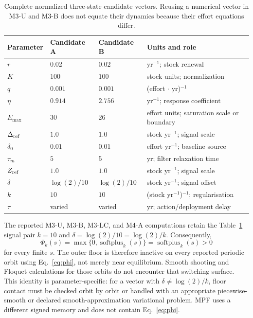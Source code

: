 \documentclass[11pt]{article}
\newcommand{\spx}{\operatorname{softplus}}
\begin{document}
\begin{table}[h]
\centering
\small
\caption{Complete normalized three-state candidate vectors. Reusing a numerical vector in M3-U and M3-B does not equate their dynamics because their effort equations differ.}
\label{tab:m3-parameters}
\begin{tabularx}{\textwidth}{p{1.7cm}XXp{3.2cm}}
\toprule
Parameter & Candidate A & Candidate B & Units and role\\
\midrule
$r$ & $0.02$ & $0.02$ & yr$^{-1}$; stock renewal\\
$K$ & $100$ & $100$ & stock units; normalization\\
$q$ & $0.001$ & $0.001$ & (effort $\cdot$ yr)$^{-1}$\\
$\eta$ & $0.914$ & $2.756$ & yr$^{-1}$; response coefficient\\
$E_{\max}$ & $30$ & $26$ & effort units; saturation scale or boundary\\
$\Delta_{\rm ref}$ & $1.0$ & $1.0$ & stock yr$^{-1}$; signal scale\\
$\delta_0$ & $0.01$ & $0.01$ & effort yr$^{-1}$; baseline source\\
$\tau_m$ & $5$ & $5$ & yr; filter relaxation time\\
$Z_{\rm ref}$ & $1.0$ & $1.0$ & stock yr$^{-1}$; signal scale\\
$\delta$ & $\log(2)/10$ & $\log(2)/10$ & stock yr$^{-1}$; signal offset\\
$k$ & $10$ & $10$ & (stock yr$^{-1}$)$^{-1}$; regularisation\\
$\tau$ & varied & varied & yr; action/deployment delay\\
\bottomrule
\end{tabularx}
\end{table}

The reported M3-U, M3-B, M3-LC, and M4-A computations retain the Table~\ref{tab:m3-parameters} signal pair $k=10$ and $\delta=\log(2)/10=\log(2)/k$. Consequently,
\[
\Phi_k(s)=\max\{0,\spx_k(s)\}=\spx_k(s)>0
\]
for every finite $s$. The outer floor is therefore inactive on every reported periodic orbit using Eq.~\eqref{eq:phi}, not merely near equilibrium. Smooth shooting and Floquet calculations for those orbits do not encounter that switching surface. This identity is parameter-specific: for a vector with $\delta\ne\log(2)/k$, floor contact must be checked orbit by orbit or handled with an appropriate piecewise-smooth or declared smooth-approximation variational problem. MPF uses a different signed memory and does not contain Eq.~\eqref{eq:phi}.
\end{document}
